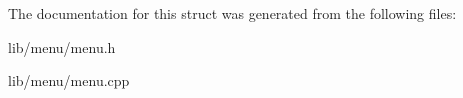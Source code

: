 The documentation for this struct was generated from the following files\-:\begin{DoxyCompactItemize}
\item 
lib/menu/menu.\-h\item 
lib/menu/menu.\-cpp\end{DoxyCompactItemize}
